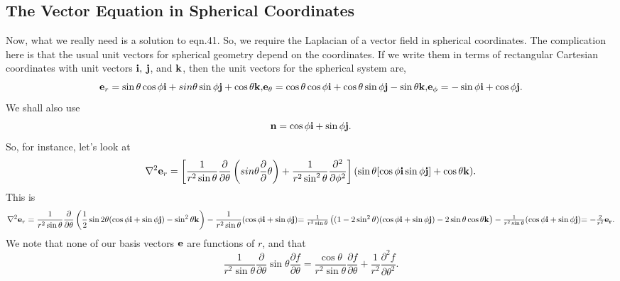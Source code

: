 \documentclass[12pt]{article}
\begin{document}
\subsection{The Vector Equation in Spherical Coordinates}
Now, what we really need is a solution to eqn.41. So, we require the Laplacian of a vector field in spherical coordinates. The complication here is that the usual unit vectors for spherical geometry depend on the coordinates. If we write them in terms of rectangular Cartesian coordinates with unit vectors ${\bf i}, \>
 {\bf j}$,  and $\bf k$, then the unit vectors for the spherical system are,
\begin{equation}
{\bf e}_r= \sin \theta \cos \phi {\bf i}
+ sin \theta \sin \phi {\bf j} +\cos \theta {\bf k},
$$    $$
{\bf e}_\theta= \cos  \theta \cos \phi {\bf i}
+ \cos  \theta \sin \phi {\bf j} -\sin  \theta {\bf k},
$$   $$
{\bf e}_\phi= -\sin \phi {\bf i}
+  \cos \phi {\bf j}. 
\end{equation}
We shall also use 
\begin{equation}
{ \bf n}= \cos \phi {\bf i}
+  \sin \phi {\bf j}. 
\end{equation}
So, for instance, let's look at
\begin{equation}
\nabla^2 {\bf e}_r
=
\left \lbrack \frac{1}{r^2 \sin \theta} \frac{\partial }{\partial \theta}
\left ( sin \theta \frac{\partial }\partial \theta \right )
+\frac{1}{r^2 \sin^2 \theta} \frac{\partial^2 } {\partial \phi^2}
\right \rbrack 
( \sin \theta [\cos \phi {\bf i}
  \sin \phi {\bf j} ] +\cos \theta {\bf k} ). 
\end{equation}
This is  
\begin{equation}
\nabla^2 {\bf e}_r=\frac{1}{r^2 \sin \theta}
 \frac{\partial }{\partial \theta} 
\left ( \frac{1}{2} \sin 2 \theta (\cos \phi {\bf i}+\sin \phi {\bf j} )
 -\sin^2 \theta {\bf k} \right )
-\frac{1}{r^2 \sin \theta }( \cos \phi {\bf i}+\sin \phi {\bf j} )
$$    $$
=\frac{1}{r^2 \sin \theta}
\left ( (1 - 2 \sin^2 \theta) (\cos \phi {\bf i}+\sin \phi {\bf j} )
-2 \sin \theta \cos \theta {\bf k} \right )
-\frac{1}{r^2 \sin \theta }( \cos \phi { \bf i}+\sin \phi {\bf j} )
$$   $$
=-\frac{2}{r^2} {\bf e_r}.
\end{equation}
We note that none of our basis vectors ${\bf e}$ are functions of $r$, and 
that
\begin{equation}
\frac{1}{r^2 \sin \theta} \frac{\partial }{\partial \theta}
\sin \theta \frac{\partial f }{\partial \theta}
=\frac{\cos \theta}{r^2 \sin \theta}
\frac{\partial f }{\partial \theta}+\frac{1}{r^2}
\frac{\partial^2 f} {\partial \theta^2}.
\end{equation}
\end{document}
